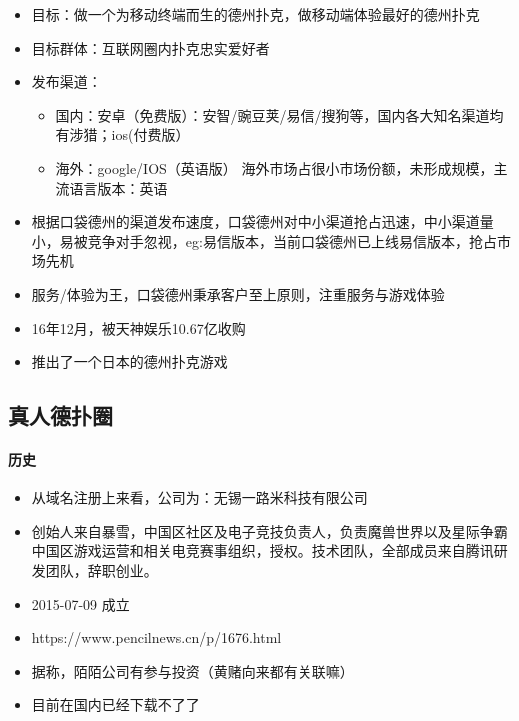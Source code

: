 \documentclass[11pt]{article}
\providecommand{\tightlist}{%
      \setlength{\itemsep}{0pt}\setlength{\parskip}{0pt}}
\begin{document}
\begin{itemize}
\tightlist
\item
  目标：做一个为移动终端而生的德州扑克，做移动端体验最好的德州扑克
\item
  目标群体：互联网圈内扑克忠实爱好者
\item
  发布渠道：

  \begin{itemize}
  \tightlist
  \item
    国内：安卓（免费版）：安智/豌豆荚/易信/搜狗等，国内各大知名渠道均有涉猎；ios(付费版）
  \item
    海外：google/IOS（英语版）
    海外市场占很小市场份额，未形成规模，主流语言版本：英语
  \end{itemize}
\item
  根据口袋德州的渠道发布速度，口袋德州对中小渠道抢占迅速，中小渠道量小，易被竞争对手忽视，eg:易信版本，当前口袋德州已上线易信版本，抢占市场先机
\item
  服务/体验为王，口袋德州秉承客户至上原则，注重服务与游戏体验
\item
  16年12月，被天神娱乐10.67亿收购
\item
  推出了一个日本的德州扑克游戏
\end{itemize}

    \hypertarget{ux771fux4ebaux5fb7ux6251ux5708}{%
\subsection{真人德扑圈}\label{ux771fux4ebaux5fb7ux6251ux5708}}

\hypertarget{ux5386ux53f2}{%
\paragraph{历史}\label{ux5386ux53f2}}

\begin{itemize}
\tightlist
\item
  从域名注册上来看，公司为：无锡一路米科技有限公司
\item
  创始人来自暴雪，中国区社区及电子竞技负责人，负责魔兽世界以及星际争霸中国区游戏运营和相关电竞赛事组织，授权。技术团队，全部成员来自腾讯研发团队，辞职创业。
\item
  2015-07-09 成立
\item
  https://www.pencilnews.cn/p/1676.html
\item
  据称，陌陌公司有参与投资（黄赌向来都有关联嘛）
\item
  目前在国内已经下载不了了
\end{itemize}
\end{document}
